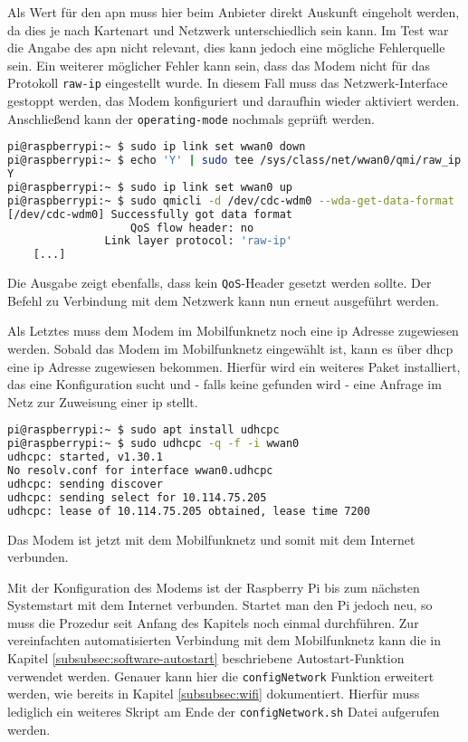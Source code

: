 \noindent Als Wert für den \gls{apn} muss hier beim Anbieter direkt Auskunft eingeholt werden, da dies je nach Kartenart und Netzwerk
unterschiedlich sein kann.
Im Test war die Angabe des \gls{apn} nicht relevant, dies kann jedoch eine mögliche Fehlerquelle sein.
Ein weiterer möglicher Fehler kann sein, dass das Modem nicht für das Protokoll \texttt{raw-ip} eingestellt wurde.
In diesem Fall muss das Netzwerk-Interface gestoppt werden, das Modem konfiguriert und daraufhin wieder aktiviert werden.
Anschließend kann der \texttt{operating-mode} nochmals geprüft werden.

\begin{lstlisting}[language=Bash]
pi@raspberrypi:~ $ sudo ip link set wwan0 down
pi@raspberrypi:~ $ echo 'Y' | sudo tee /sys/class/net/wwan0/qmi/raw_ip
Y
pi@raspberrypi:~ $ sudo ip link set wwan0 up
pi@raspberrypi:~ $ sudo qmicli -d /dev/cdc-wdm0 --wda-get-data-format
[/dev/cdc-wdm0] Successfully got data format
                   QoS flow header: no
               Link layer protocol: 'raw-ip'
    [...]
\end{lstlisting}

\noindent Die Ausgabe zeigt ebenfalls, dass kein \texttt{QoS}-Header gesetzt werden sollte.
Der Befehl zu Verbindung mit dem Netzwerk kann nun erneut ausgeführt werden.

Als Letztes muss dem Modem im Mobilfunknetz noch eine \gls{ip} Adresse zugewiesen werden.
Sobald das Modem im Mobilfunknetz eingewählt ist, kann es über \gls{dhcp} eine \gls{ip} Adresse zugewiesen bekommen.
Hierfür wird ein weiteres Paket installiert, das eine Konfiguration sucht und - falls keine gefunden wird - eine
Anfrage im Netz zur Zuweisung einer \gls{ip} stellt.

\begin{lstlisting}[language=Bash]
pi@raspberrypi:~ $ sudo apt install udhcpc
pi@raspberrypi:~ $ sudo udhcpc -q -f -i wwan0
udhcpc: started, v1.30.1
No resolv.conf for interface wwan0.udhcpc
udhcpc: sending discover
udhcpc: sending select for 10.114.75.205
udhcpc: lease of 10.114.75.205 obtained, lease time 7200
\end{lstlisting}

\noindent Das Modem ist jetzt mit dem Mobilfunknetz und somit mit dem Internet verbunden.


Mit der Konfiguration des Modems ist der Raspberry Pi bis zum nächsten Systemstart mit dem Internet verbunden.
Startet man den Pi jedoch neu, so muss die Prozedur seit Anfang des Kapitels noch einmal durchführen.
Zur vereinfachten automatisierten Verbindung mit dem Mobilfunknetz kann die in Kapitel \ref{subsubsec:software-autostart}
beschriebene Autostart-Funktion verwendet werden.
Genauer kann hier die \texttt{configNetwork} Funktion erweitert werden, wie bereits in Kapitel \ref{subsubsec:wifi}
dokumentiert.
Hierfür muss lediglich ein weiteres Skript am Ende der \texttt{configNetwork.sh} Datei aufgerufen werden.

